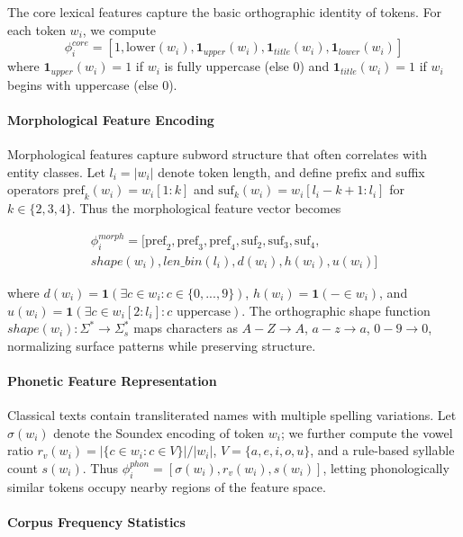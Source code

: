 \documentclass[conference]{IEEEtran}
\begin{document}
The core lexical features capture the basic orthographic identity of tokens. For each token \(w_i\), we compute
\[
\phi_i^{core} =
\left[
1,
\text{lower}(w_i),
\mathbf{1}_{upper}(w_i),
\mathbf{1}_{title}(w_i),
\mathbf{1}_{lower}(w_i)
\right]
\]
where \(\mathbf{1}_{upper}(w_i)=1\) if \(w_i\) is fully uppercase (else \(0\)) and \(\mathbf{1}_{title}(w_i)=1\) if \(w_i\) begins with uppercase (else \(0\)).

\paragraph{Morphological Feature Encoding}

Morphological features capture subword structure that often correlates with entity classes. Let \(l_i = |w_i|\) denote token length, and define prefix and suffix operators \(\text{pref}_k(w_i) = w_i[1:k]\) and \(\text{suf}_k(w_i) = w_i[l_i-k+1:l_i]\) for \(k \in \{2,3,4\}\). Thus the morphological feature vector becomes

\begin{multline*}
\phi_i^{morph} =
[
\text{pref}_2,\text{pref}_3,\text{pref}_4,
\text{suf}_2,\text{suf}_3,\text{suf}_4,\\
shape(w_i),
len\_bin(l_i),
d(w_i),
h(w_i),
u(w_i)
]
\end{multline*}

where \(d(w_i) = \mathbf{1}(\exists c \in w_i : c \in \{0,...,9\})\), \(h(w_i) = \mathbf{1}(- \in w_i)\), and \(u(w_i) = \mathbf{1}(\exists c \in w_i[2:l_i] : c \text{ uppercase})\). The orthographic shape function \(shape(w_i) : \Sigma^* \rightarrow \Sigma_s^*\) maps characters as \(A{-}Z \rightarrow A\), \(a{-}z \rightarrow a\), \(0{-}9 \rightarrow 0\), normalizing surface patterns while preserving structure.

\paragraph{Phonetic Feature Representation}

Classical texts contain transliterated names with multiple spelling variations. Let \(\sigma(w_i)\) denote the Soundex encoding of token \(w_i\); we further compute the vowel ratio \(r_v(w_i) = | \{ c \in w_i : c \in V \} | / |w_i|\), \(V = \{a,e,i,o,u\}\), and a rule-based syllable count \(s(w_i)\). Thus \(\phi_i^{phon} = [\sigma(w_i), r_v(w_i), s(w_i)]\), letting phonologically similar tokens occupy nearby regions of the feature space.

\paragraph{Corpus Frequency Statistics}
\end{document}
